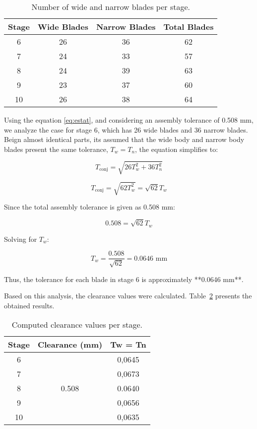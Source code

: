 \begin{table}[h]
    \centering
    \begin{tabular}{@{}cccc@{}}
        \toprule
        Stage & Wide Blades & Narrow Blades & Total Blades \\ 
        \midrule
        6  & 26 & 36 & 62 \\ 
        7  & 24 & 33 & 57 \\ 
        8  & 24 & 39 & 63 \\ 
        9  & 23 & 37 & 60 \\ 
        10 & 26 & 38 & 64 \\ 
        \bottomrule
    \end{tabular}
    \caption{Number of wide and narrow blades per stage.}
    \label{tab:blade_distribution}
\end{table}

Using the equation \ref{eq:estat}, and considering an assembly tolerance of 0.508 mm, we analyze the case for stage 6, which has 26 wide blades and 36 narrow blades. Beign almost identical parts, its assumed that the wide body and narrow body blades present the same tolerance, \( T_w = T_n \), the equation simplifies to:

\begin{equation}
    T_{\text{conj}} = \sqrt{26T_w^2 + 36T_n^2}
\end{equation}

\begin{equation}
    T_{\text{conj}} = \sqrt{62T_w^2} = \sqrt{62} T_w
\end{equation}

Since the total assembly tolerance is given as 0.508 mm:

\begin{equation}
    0.508 = \sqrt{62} T_w
\end{equation}

Solving for \( T_w \):

\begin{equation}
    T_w = \frac{0.508}{\sqrt{62}} = 0.0646 \text{ mm}
\end{equation}

Thus, the tolerance for each blade in stage 6 is approximately **0.0646 mm**.

Based on this analysis, the clearance values were calculated. Table~\ref{tab:clearance} presents the obtained results.

\begin{table}[h]
    \centering
    \label{tab:clearance}
    \begin{tabular}{@{}ccc@{}}
        \toprule
        Stage & Clearance (mm) & Tw = Tn \\ 
        \midrule
        6  & & 0,0645    \\ 
        7  &   & 0,0673    \\ 
        8  & 0.508  & 0.0640 \\ 
        9  &   & 0,0656    \\ 
        10 &   & 0,0635    \\ 
        \bottomrule
    \end{tabular}
    \caption{Computed clearance values per stage.}
\end{table}

